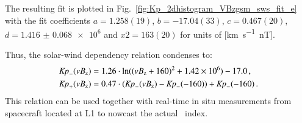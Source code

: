 The resulting fit is plotted in Fig.~\ref{fig:Kp_2dhistogram_VBzgsm_sws_fit_e} with the fit coefficients $a = 1.258(19)$, $b = -17.04(33)$, $c = 0.467(20)$, $d = \num{1.416(68)e6}$ and $x2 = 163(20)$ for units of [\si{\km\per\s \nano\tesla}].\\
\begin{figure}
\end{figure}

Thus, the solar-wind dependency relation condenses to:
\begin{align}
	\text{\textit{Kp}}_-(vB_\text{z}) &= 1.26 \cdot \ln((vB_\text{z} + 160)^2 + \num{1.42e6}) - 17.0	\,,	\label{eq:kpvsvbz_dependency_function_negative}\\
	\text{\textit{Kp}}_+(vB_\text{z}) &= 0.47 \cdot (\text{\textit{Kp}}_-(vB_\text{z}) - \text{\textit{Kp}}_-(-160)) + \text{\textit{Kp}}_-(-160)	\,.	\label{eq:kpvsvbz_dependency_function_positive}
\end{align}
This relation can be used together with real-time in situ measurements from spacecraft located at L1 to nowcast the actual \Kp~index.\\


